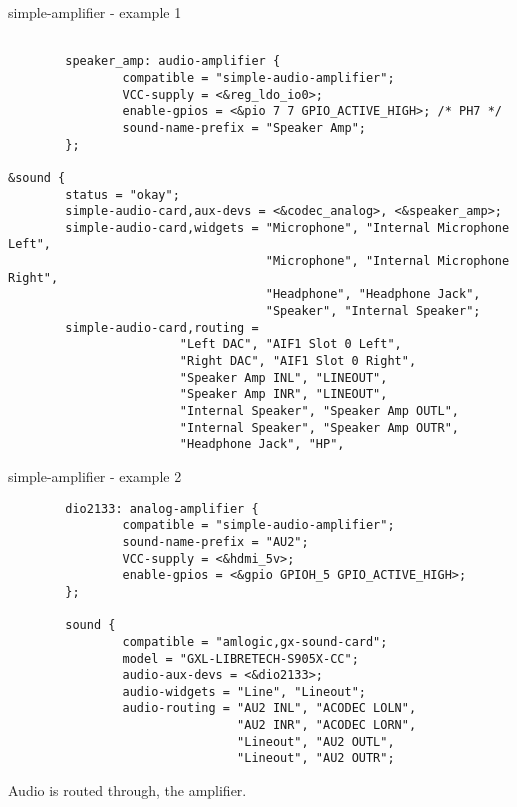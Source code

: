 \begin{frame}[fragile]{simple-amplifier - example 1}
  \begin{block}{}
    \fontsize{7}{6}\selectfont
    \begin{verbatim}

        speaker_amp: audio-amplifier {
                compatible = "simple-audio-amplifier";
                VCC-supply = <&reg_ldo_io0>;
                enable-gpios = <&pio 7 7 GPIO_ACTIVE_HIGH>; /* PH7 */
                sound-name-prefix = "Speaker Amp";
        };

&sound {
        status = "okay";
        simple-audio-card,aux-devs = <&codec_analog>, <&speaker_amp>;
        simple-audio-card,widgets = "Microphone", "Internal Microphone Left",
                                    "Microphone", "Internal Microphone Right",
                                    "Headphone", "Headphone Jack",
                                    "Speaker", "Internal Speaker";
        simple-audio-card,routing =
                        "Left DAC", "AIF1 Slot 0 Left",
                        "Right DAC", "AIF1 Slot 0 Right",
                        "Speaker Amp INL", "LINEOUT",
                        "Speaker Amp INR", "LINEOUT",
                        "Internal Speaker", "Speaker Amp OUTL",
                        "Internal Speaker", "Speaker Amp OUTR",
                        "Headphone Jack", "HP",
    \end{verbatim}
  \end{block}
\end{frame}

\begin{frame}[fragile]{simple-amplifier - example 2}
  \begin{block}{}
    \fontsize{7}{6}\selectfont
    \begin{verbatim}
        dio2133: analog-amplifier {
                compatible = "simple-audio-amplifier";
                sound-name-prefix = "AU2";
                VCC-supply = <&hdmi_5v>;
                enable-gpios = <&gpio GPIOH_5 GPIO_ACTIVE_HIGH>;
        };

        sound {
                compatible = "amlogic,gx-sound-card";
                model = "GXL-LIBRETECH-S905X-CC";
                audio-aux-devs = <&dio2133>;
                audio-widgets = "Line", "Lineout";
                audio-routing = "AU2 INL", "ACODEC LOLN",
                                "AU2 INR", "ACODEC LORN",
                                "Lineout", "AU2 OUTL",
                                "Lineout", "AU2 OUTR";
    \end{verbatim}
  \end{block}
  Audio is routed through, the amplifier.
\end{frame}

